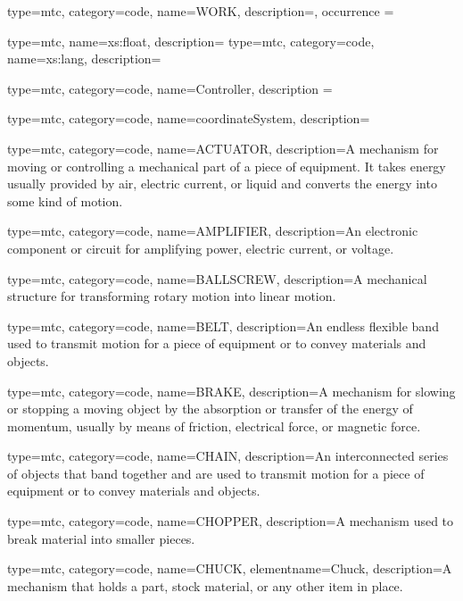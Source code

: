 {
  type=mtc,
  category=code,
  name={WORK},
  description={},
  occurrence = {}
}

{
  type=mtc,
  name={xs:float},
  description={}
}
{
  type=mtc,
  category=code,
  name={xs:lang},
  description={}
}

{
  type=mtc,
  category=code,
  name={Controller},
  description = {}
}

{
type=mtc,
category=code,
name={coordinateSystem},
description={}
}



{
  type=mtc,
  category=code,
  name={ACTUATOR},
  description={A mechanism for moving or controlling a mechanical part of a piece of equipment.   \newline It takes energy usually provided by air, electric current, or liquid and converts the energy into some kind of motion.  }
}

{
  type=mtc,
  category=code,
  name={AMPLIFIER},
  description={An electronic component or circuit for amplifying power, electric current, or voltage.}
}

{
  type=mtc,
  category=code,
  name={BALLSCREW},
  description={A mechanical structure for transforming rotary motion into linear motion.}
}

{
  type=mtc,
  category=code,
  name={BELT},
  description={An endless flexible band used to transmit motion for a piece of equipment or to convey materials and objects.}
}

{
  type=mtc,
  category=code,
  name={BRAKE},
  description={A mechanism for slowing or stopping a moving object by the absorption or transfer of the energy of momentum, usually by means of friction, electrical force, or magnetic force.}
}

{
  type=mtc,
  category=code,
  name={CHAIN},
  description={An interconnected series of objects that band together and are used to transmit motion for a piece of equipment or to convey materials and objects.}
}

{
  type=mtc,
  category=code,
  name={CHOPPER},
  description={A mechanism used to break material into smaller pieces.}
}

{
  type=mtc,
  category=code,
  name={CHUCK},
  elementname={Chuck},
  description={A mechanism that holds a part, stock material, or any other item in place.}
}

